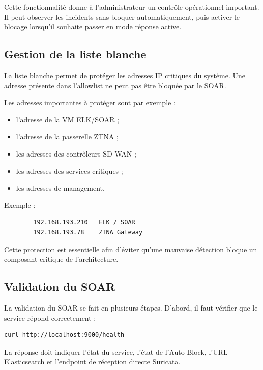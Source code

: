 \documentclass[12pt,a4paper,oneside]{report}
\begin{document}
    Cette fonctionnalité donne à l'administrateur un contrôle opérationnel important. Il peut observer les incidents sans bloquer automatiquement, puis activer le blocage lorsqu'il souhaite passer en mode réponse active.
    
    \subsection{Gestion de la liste blanche}
    
    La liste blanche permet de protéger les adresses IP critiques du système. Une adresse présente dans l'allowlist ne peut pas être bloquée par le SOAR.
    
    Les adresses importantes à protéger sont par exemple :
    
    \begin{itemize}
    	\item l'adresse de la VM ELK/SOAR ;
    	\item l'adresse de la passerelle ZTNA ;
    	\item les adresses des contrôleurs SD-WAN ;
    	\item les adresses des services critiques ;
    	\item les adresses de management.
    \end{itemize}
    
    Exemple :
    
    \begin{lstlisting}
    	192.168.193.210   ELK / SOAR
    	192.168.193.78    ZTNA Gateway
    \end{lstlisting}
    
    Cette protection est essentielle afin d'éviter qu'une mauvaise détection bloque un composant critique de l'architecture.
    
    \subsection{Validation du SOAR}
    
    La validation du SOAR se fait en plusieurs étapes. D'abord, il faut vérifier que le service répond correctement :
    
    \begin{lstlisting}[language=bash]
    	curl http://localhost:9000/health
    \end{lstlisting}
    
    La réponse doit indiquer l'état du service, l'état de l'Auto-Block, l'URL Elasticsearch et l'endpoint de réception directe Suricata.
    
\end{document}
